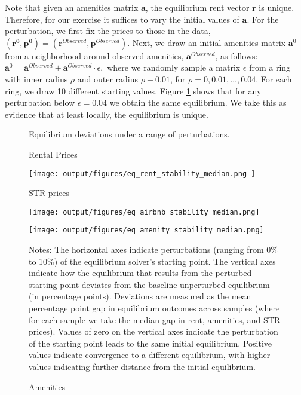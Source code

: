 \documentclass[11pt]{article}
\begin{document}
Note that given an amenities matrix $\mathbf{a}$, the equilibrium rent vector $\mathbf{r}$ is unique. Therefore, for our exercise it suffices to vary the initial values of $\mathbf{a}$. For the perturbation, we first fix the prices to those in the data, $(\mathbf{r^0},  \mathbf{p^0})= (\mathbf{r}^{Observed},\mathbf{p}^{Observed}).$ Next, we draw an initial amenities matrix $\textbf{a}^0$ from a neighborhood around observed amenities, $\textbf{a}^{Observed}$, as follows: $\textbf{a}^0 = \textbf{a}^{Observed} + \textbf{a}^{Observed}\cdot\epsilon,$ where we randomly sample a matrix $\epsilon$ from a ring with inner radius $\rho$ and outer radius $\rho + 0.01$, for $\rho = 0, 0.01, \hdots, 0.04$. For each ring, we draw 10 different starting values.  Figure \ref{fig: amenities perturbations - plots - deviation proportions} shows that for any perturbation below $\epsilon=0.04$ we obtain the same equilibrium. We take this as evidence that at least locally, the equilibrium is unique. 

\begin{figure}[H]
    \caption{Equilibrium deviations under a range of perturbations.}\label{fig: amenities perturbations - plots - deviation proportions}
    \centering
    \begin{minipage}{0.34\textwidth}
    \caption*{\small {Rental Prices}}
        \texttt{[image: output/figures/eq\_rent\_stability\_median.png ]}
    \end{minipage}%
    \begin{minipage}{0.34\textwidth}
         \caption*{\small {STR prices}}
        \texttt{[image: output/figures/eq\_airbnb\_stability\_median.png]}
    \end{minipage}%
    \begin{minipage}{0.34\textwidth}
    \caption*{\small {Amenities}}
        \texttt{[image: output/figures/eq\_amenity\_stability\_median.png]}
    \end{minipage}
    \begin{minipage}{\textwidth}{\scriptsize Notes: The horizontal axes indicate perturbations (ranging from 0\% to 10\%) of the equilibrium solver's starting point. The vertical axes indicate how the equilibrium that results from the perturbed starting point deviates from the baseline unperturbed equilibrium (in percentage points). Deviations are measured as the mean percentage point gap in equilibrium outcomes across samples (where for each sample we take the median gap in rent, amenities, and STR prices). Values of zero on the vertical axes indicate the perturbation of the starting point leads to the same initial equilibrium. Positive values indicate convergence to a different equilibrium, with higher values indicating further distance from the initial equilibrium.}
    \end{minipage}
\end{figure}
\end{document}
